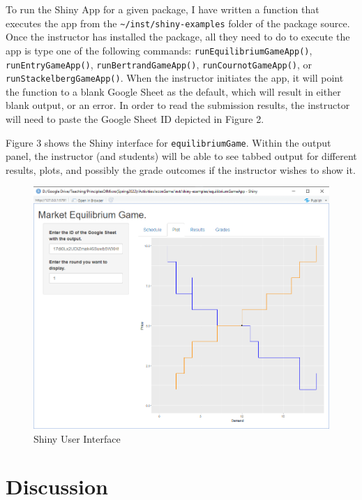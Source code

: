 \documentclass[
]{article}
\begin{document}
To run the Shiny App for a given package, I have written a function that
executes the app from the
\texttt{\textquotesingle{}\textasciitilde{}/inst/shiny-examples\textquotesingle{}}
folder of the package source. Once the instructor has installed the
package, all they need to do to execute the app is type one of the
following commands:
\texttt{\textquotesingle{}runEquilibriumGameApp()\textquotesingle{}},
\texttt{\textquotesingle{}runEntryGameApp()\textquotesingle{}},
\texttt{\textquotesingle{}runBertrandGameApp()\textquotesingle{}},
\texttt{\textquotesingle{}runCournotGameApp()\textquotesingle{}}, or
\texttt{\textquotesingle{}runStackelbergGameApp()\textquotesingle{}}.
When the instructor initiates the app, it will point the function to a
blank Google Sheet as the default, which will result in either blank
output, or an error. In order to read the submission results, the
instructor will need to paste the Google Sheet ID depicted in Figure 2.

Figure 3 shows the Shiny interface for \texttt{equilibriumGame}. Within
the output panel, the instructor (and students) will be able to see
tabbed output for different results, plots, and possibly the grade
outcomes if the instructor wishes to show it.

\begin{figure}
\centering
\includegraphics{images/Figure3.png}
\caption{Shiny User Interface}
\end{figure}

\hypertarget{discussion}{%
\section{Discussion}\label{discussion}}
\end{document}
